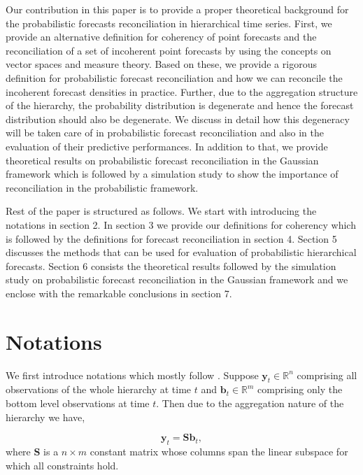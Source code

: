 \documentclass[a4paper, 11pt]{article}
\begin{document}
	Our contribution in this paper is to provide a proper theoretical background for the probabilistic forecasts reconciliation in hierarchical time series. First, we provide an alternative definition for coherency of point forecasts and the reconciliation of a set of incoherent point forecasts by using the concepts on vector spaces and measure theory. Based on these, we provide a rigorous definition for probabilistic forecast reconciliation and how we can reconcile the incoherent forecast densities in practice. Further, due to the aggregation structure of the hierarchy, the probability distribution is degenerate and hence the forecast distribution should also be degenerate. We discuss in detail how this degeneracy will be taken care of in probabilistic forecast reconciliation and also in the evaluation of their predictive performances. In addition to that, we provide theoretical results on probabilistic forecast reconciliation in the Gaussian framework which is followed by a simulation study to show the importance of reconciliation in the probabilistic framework. 
	
	Rest of the paper is structured as follows. We start with introducing the notations in section 2. In section 3 we provide our definitions for coherency which is followed by the definitions for forecast reconciliation in section 4. Section 5 discusses the methods that can be used for evaluation of probabilistic hierarchical forecasts. Section 6 consists the theoretical results followed by the simulation study on probabilistic forecast reconciliation in the Gaussian framework and we enclose with the remarkable conclusions in section 7.     
	
	
	\section{Notations}\label{sec:notation}
	
	We first introduce notations which mostly follow \citet{Wickramasuriya2017}. Suppose $\mathbold{y}_t \in \bm{\mathbb{R}}^n$ comprising all observations of the whole hierarchy at time $t$ and $\mathbold{b}_t \in \bm{\mathbb{R}}^m$ comprising only the bottom level observations at  time $t$. Then due to the aggregation nature of the hierarchy we have, 
	
	\begin{equation}
	\mathbold{y}_t = \mathbold{Sb}_t,
	\end{equation}
	where $\mathbold{S}$ is a $n \times m$ constant matrix whose columns span the linear subspace for which all constraints hold.  
	
\end{document}
